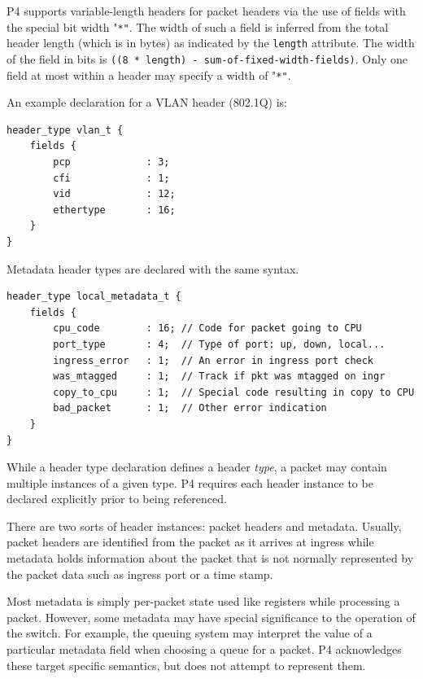 \documentclass[12pt]{article}
\begin{document}
P4 supports variable-length headers for packet headers via the use of fields 
with the special bit width "\texttt{*"}. The width of such a field is inferred from 
the total header length (which is in bytes) as indicated by the \texttt{length} attribute. 
 The width of the field in bits is \texttt{((8 * length) - sum-of-fixed-width-fields)}. 
Only one field at most within a header may specify a width of "\texttt{*"}.

An example declaration for a VLAN header (802.1Q) is:

\begin{lstlisting}[keywords={},frame=single,escapechar=\@]
header_type vlan_t {
    fields {
        pcp             : 3;
        cfi             : 1;
        vid             : 12;
        ethertype       : 16;
    }
}
\end{lstlisting}

Metadata header types are declared with the same syntax.

\begin{lstlisting}[keywords={},frame=single,escapechar=\@]
header_type local_metadata_t {
    fields {
        cpu_code        : 16; // Code for packet going to CPU
        port_type       : 4;  // Type of port: up, down, local...
        ingress_error   : 1;  // An error in ingress port check
        was_mtagged     : 1;  // Track if pkt was mtagged on ingr
        copy_to_cpu     : 1;  // Special code resulting in copy to CPU
        bad_packet      : 1;  // Other error indication
    }
}
\end{lstlisting}



While a header type declaration defines a header \textit{type}, a packet may contain 
multiple instances of a given type.  P4 requires each header instance to 
be declared explicitly prior to being referenced. 

There are two sorts of header instances: packet headers and metadata. Usually, 
packet headers are identified from the packet as it arrives at ingress while 
metadata holds information about the packet that is not normally represented 
by the packet data such as ingress port or a time stamp.  

Most metadata is simply per-packet state used like registers while processing 
a packet.  However, some metadata may have special significance to the operation 
of the switch.  For example, the queuing system may interpret the value of 
a particular metadata field when choosing a queue for a packet.  P4 acknowledges 
these target specific semantics, but does not attempt to represent them.
\end{document}
